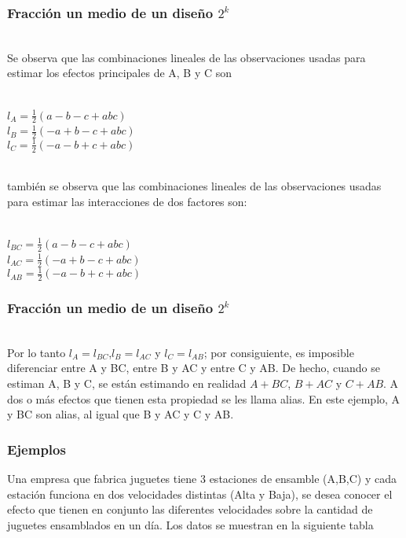 \documentclass[12pt]{beamer}
\begin{document}
\begin{frame}
\frametitle{Fracción un medio de un diseño $ 2^{k} $}
~\\Se observa que las combinaciones lineales de las observaciones usadas para estimar los efectos principales de A, B y C son
\begin{center}
~\\$l_{A}=\frac{1}{2}(a-b-c+abc)$
~\\$l_{B}=\frac{1}{2}(-a+b-c+abc)$
~\\$l_{C}=\frac{1}{2}(-a-b+c+abc)$
\end{center}
~\\también se observa que las combinaciones lineales de las observaciones usadas para estimar las interacciones de dos factores son:
\begin{center}
~\\$l_{BC}=\frac{1}{2}(a-b-c+abc)$
~\\$l_{AC}=\frac{1}{2}(-a+b-c+abc)$
~\\$l_{AB}=\frac{1}{2}(-a-b+c+abc)$
\end{center}
\end{frame}

\begin{frame}
\frametitle{Fracción un medio de un diseño $ 2^{k} $}
~\\Por lo tanto $l_{A}=l_{BC}$,$l_{B}=l_{AC}$ y $l_{C}=l_{AB}$; por consiguiente, es imposible diferenciar entre A y BC, entre B y AC y entre C y AB. De hecho, cuando se estiman A, B y C, se están estimando en realidad $A+BC$, $B+AC$ y $C+AB$. A dos o más efectos que tienen esta propiedad se les llama alias. En este ejemplo, A y BC son alias, al igual que B y AC y C y AB.
\end{frame}

\begin{frame}
\frametitle{Ejemplos}
Una empresa que fabrica juguetes tiene 3 estaciones de ensamble (A,B,C) y cada estación funciona en dos velocidades distintas (Alta y Baja), se desea conocer el efecto que tienen en conjunto las diferentes velocidades sobre la cantidad de juguetes ensamblados en un día. Los datos se muestran en la siguiente tabla
\end{frame}
\end{document}
